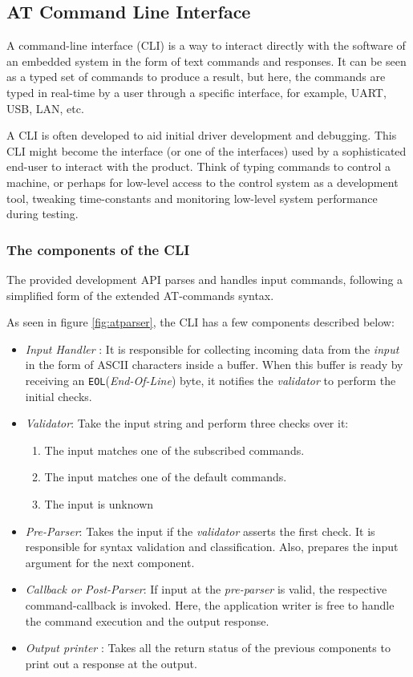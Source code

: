 \documentclass{article}
\begin{document}
\subsection{AT Command Line Interface} 
A command-line interface (CLI) is a way to interact directly with the software of an embedded system in the form of text commands and responses. It can be seen as a typed set of commands to produce a result, but here, the commands are typed in real-time by a user through a specific interface, for example, UART, USB, LAN, etc. 

A CLI is often developed to aid initial driver development and debugging. This CLI might become the interface (or one of the interfaces) used by a sophisticated end-user to interact with the product. Think of typing commands to control a machine, or perhaps for low-level access to the control system as a development tool, tweaking time-constants and monitoring low-level system performance during testing. 


\subsubsection{The components of the CLI}
The provided development API parses and handles input commands, following a simplified form of the extended AT-commands syntax. 



As seen in figure \ref{fig:atparser}, the CLI has a few components described below:
\begin{itemize}
    \item  \textit{Input Handler} : It is responsible for collecting incoming data from the \textit{input} in the form of ASCII characters inside a buffer. When this buffer is ready by receiving an \lstinline{EOL}(\textit{End-Of-Line}) byte, it notifies the \textit{validator} to perform the initial checks.
    \item \textit{Validator}: Take the input string and perform three checks over it:
    \begin{enumerate}
        \item The input matches one of the subscribed commands.
        \item The input matches one of the default commands.
        \item The input is unknown
    \end{enumerate}
    \item \textit{Pre-Parser}: Takes the input if the \textit{validator} asserts the first check. It is responsible for syntax validation and classification. Also, prepares the input argument for the next component.
    \item \textit{Callback or Post-Parser}: If input at the \textit{pre-parser} is valid, the respective command-callback is invoked. Here, the application writer is free to handle the command execution and the output response.
    \item \textit{Output printer} : Takes all the return status of the previous components to print out a response at the output.
\end{itemize}
\end{document}
